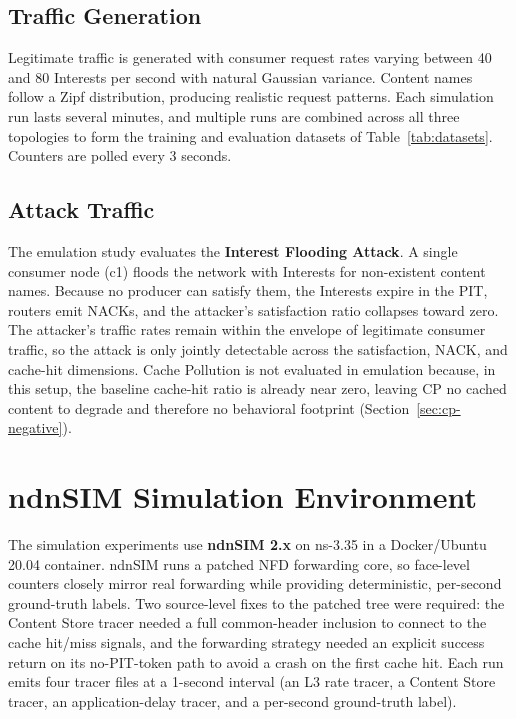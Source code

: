 \documentclass[12pt]{report}
\begin{document}
\subsection{Traffic Generation}
Legitimate traffic is generated with consumer request rates varying between 40 and 80 Interests per second with natural Gaussian variance. Content names follow a Zipf distribution, producing realistic request patterns. Each simulation run lasts several minutes, and multiple runs are combined across all three topologies to form the training and evaluation datasets of Table~\ref{tab:datasets}. Counters are polled every 3 seconds.

\subsection{Attack Traffic}
The emulation study evaluates the \textbf{Interest Flooding Attack}. A single consumer node (c1) floods the network with Interests for non-existent content names. Because no producer can satisfy them, the Interests expire in the PIT, routers emit NACKs, and the attacker's satisfaction ratio collapses toward zero. The attacker's traffic rates remain within the envelope of legitimate consumer traffic, so the attack is only jointly detectable across the satisfaction, NACK, and cache-hit dimensions. Cache Pollution is not evaluated in emulation because, in this setup, the baseline cache-hit ratio is already near zero, leaving CP no cached content to degrade and therefore no behavioral footprint (Section~\ref{sec:cp-negative}).

\section{ndnSIM Simulation Environment}
\label{sec:ndnsim-setup}

The simulation experiments use \textbf{ndnSIM 2.x} on ns-3.35 in a Docker/Ubuntu 20.04 container. ndnSIM runs a patched NFD forwarding core, so face-level counters closely mirror real forwarding while providing deterministic, per-second ground-truth labels. Two source-level fixes to the patched tree were required: the Content Store tracer needed a full common-header inclusion to connect to the cache hit/miss signals, and the forwarding strategy needed an explicit success return on its no-PIT-token path to avoid a crash on the first cache hit. Each run emits four tracer files at a 1-second interval (an L3 rate tracer, a Content Store tracer, an application-delay tracer, and a per-second ground-truth label).
\end{document}
